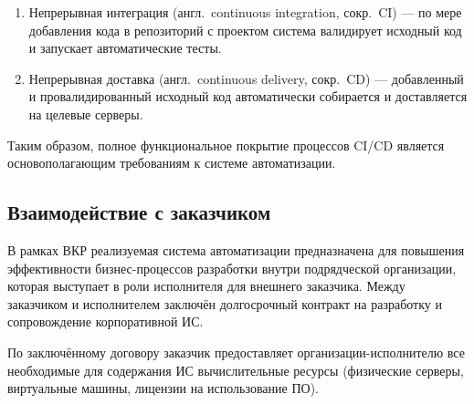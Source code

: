 \begin{enumerate}
	\item Непрерывная интеграция (англ.\ continuous integration, сокр.\ CI) --- по мере добавления кода в репозиторий с проектом система валидирует исходный код и запускает автоматические тесты.
	\item Непрерывная доставка (англ.\ continuous delivery, сокр.\ CD) --- добавленный и провалидированный исходный код автоматически собирается и доставляется на целевые серверы.
\end{enumerate}

Таким образом, полное функциональное покрытие процессов CI/CD является основополагающим требованиям к системе автоматизации.

\subsection{Взаимодействие с заказчиком}\label{subsec:communication-with-the-customer}

В рамках ВКР реализуемая система автоматизации предназначена для повышения эффективности бизнес-процессов разработки внутри подрядческой организации, которая выступает в роли исполнителя для внешнего заказчика. Между заказчиком и исполнителем заключён долгосрочный контракт на разработку и сопровождение корпоративной ИС.

По заключённому договору заказчик предоставляет организации-исполнителю все необходимые для содержания ИС вычислительные ресурсы (физические серверы, виртуальные машины, лицензии на использование ПО).

